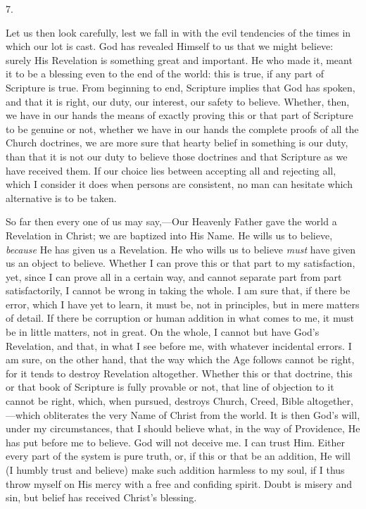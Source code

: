 7.

Let us then look carefully, lest we fall in with the evil
tendencies of the times in which our lot is cast. God has revealed
Himself to us that we might believe: surely His Revelation is
something great and important. He who made it, meant it to be a
blessing even to the end of the world: this is true, if any part of
Scripture is true. From beginning to end, Scripture implies that God
has spoken, and that it is right, our duty, our interest, our safety
to believe. Whether, then, we have in our hands the means of exactly
proving this or that part of Scripture to be genuine or not,
whether we have in our hands the complete proofs of all the Church
doctrines, we are more sure that hearty belief in something is our
duty, than that it is not our duty to believe those doctrines and that
Scripture as we have received them. If our choice lies between
accepting all and rejecting all, which I consider it does when persons
are consistent, no man can hesitate which alternative is to be taken.

So far then every one of us may say,—Our Heavenly Father gave the
world a Revelation in Christ; we are baptized into His Name. He wills
us to believe, \emph{because} He has given us a Revelation. He who
wills us to believe \emph{must} have given us an object to believe.
Whether I can prove this or that part to my satisfaction, yet, since I
can prove all in a certain way, and cannot separate part from part
satisfactorily, I cannot be wrong in taking the whole. I am sure that,
if there be error, which I have yet to learn, it must be, not in
principles, but in mere matters of detail. If there be corruption or
human addition in what comes to me, it must be in little matters, not
in great. On the whole, I cannot but have God's Revelation, and that,
in what I see before me, with whatever incidental errors. I am sure,
on the other hand, that the way which the Age follows cannot be right,
for it tends to destroy Revelation altogether. Whether this or that
doctrine, this or that book of Scripture is fully provable or not,
that line of objection to it cannot be right, which, when pursued,
destroys Church, Creed, Bible altogether,—which obliterates the very
Name of Christ from the world. It is then God's will, under my
circumstances, that I should believe what, in the way of Providence,
He has put before me to believe. God will not deceive me. I can trust
Him. Either every part of the system is pure truth, or, if this or
that be an addition, He will (I humbly trust and believe) make
such addition harmless to my soul, if I thus throw myself on His mercy
with a free and confiding spirit. Doubt is misery and sin, but belief
has received Christ's blessing.

